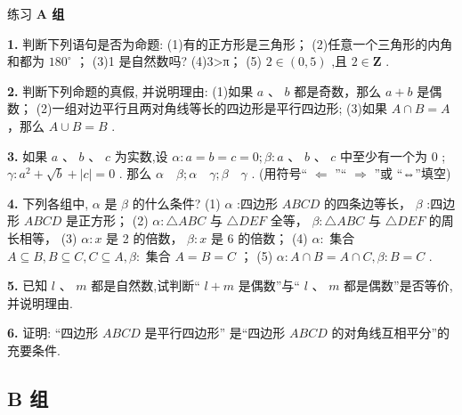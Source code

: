 \documentclass[a4paper,10pt,oneside,fontset=none]{ctexbook}
\newcommand{\fillin}[1][2cm]{\,\underline{\hspace{#1}}\,}
\newenvironment{exercise}[1][]{\begin{exBox}{练习}{#1}}{\end{exBox}}
\numberwithin{equation}{chapter}
\begin{document}
\begin{exercise}
\textbf{A 组}\par\vspace{0.5em}
\textbf{1.} 判断下列语句是否为命题: (1)有的正方形是三角形； (2)任意一个三角形的内角和都为 ${180}^{ \circ  }$ ； (3)1 是自然数吗? (4)3>π； (5) $2 \in  \left( {0,5}\right)$ ,且 $2 \in  \mathbf{Z}$ .
\par\vspace{0.8em}
\textbf{2.} 判断下列命题的真假, 并说明理由: (1)如果 $a\text{ 、 }b$ 都是奇数，那么 $a + b$ 是偶数； (2)一组对边平行且两对角线等长的四边形是平行四边形; (3)如果 $A \cap  B = A$ ，那么 $A \cup  B = B$ .
\par\vspace{0.8em}
\textbf{3.} 如果 $a\text{ 、 }b\text{ 、 }c$ 为实数,设 $\alpha  : a = b = c = 0;\beta  : a\text{ 、 }b\text{ 、 }c$ 中至少有一个为 0 ; $\gamma  : {a}^{2} + \sqrt{b} + \left| c\right|  = 0$ . 那么 $\alpha$ \fillin[2cm] $\beta ;\alpha$ \fillin[2cm] $\gamma ;\beta$ \fillin[2cm] $\gamma$ . (用符号“ $\Leftarrow$ ”“ $\Rightarrow$ ”或 “⇔”填空)
\par\vspace{0.8em}
\textbf{4.} 下列各组中, $\alpha$ 是 $\beta$ 的什么条件? (1) $\alpha$ :四边形 ${ABCD}$ 的四条边等长， $\beta$ :四边形 ${ABCD}$ 是正方形； (2) $\alpha  : {\bigtriangleup {ABC}}$ 与 ${\bigtriangleup {DEF}}$ 全等， $\beta  : {\bigtriangleup {ABC}}$ 与 ${\bigtriangleup {DEF}}$ 的周长相等， (3) $\alpha  : x$ 是 2 的倍数， $\beta  : x$ 是 6 的倍数； (4) $\alpha  :$ 集合 $A \subseteq  B, B \subseteq  C, C \subseteq  A,\beta  :$ 集合 $A = B = C$ ； (5) $\alpha  : A \cap  B = A \cap  C,\beta  : B = C$ .
\par\vspace{0.8em}
\textbf{5.} 已知 $l\text{ 、 }m$ 都是自然数,试判断“ $l + m$ 是偶数”与“ $l\text{ 、 }m$ 都是偶数”是否等价,并说明理由.
\par\vspace{0.8em}
\textbf{6.} 证明: “四边形 ${ABCD}$ 是平行四边形” 是“四边形 ${ABCD}$ 的对角线互相平分”的充要条件.
\end{exercise}

\subsection*{B 组}
\end{document}
